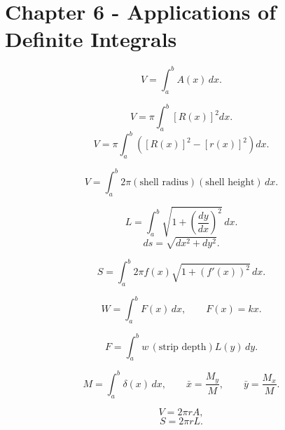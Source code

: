 
\section*{Chapter 6 - Applications of Definite Integrals}

\[
  V=\int_a^b A(x)\,dx.
\]

\[
  V=\pi\int_a^b\left[R(x)\right]^2dx.
\]
\[
  V=\pi\int_a^b\left(\left[R(x)\right]^2-\left[r(x)\right]^2\right)dx.
\]

\[
  V=\int_a^b 2\pi(\text{shell radius})(\text{shell height})\,dx.
\]

\[
  L=\int_a^b\sqrt{1+\left(\frac{dy}{dx}\right)^2}\,dx.
\]
\[
  ds=\sqrt{dx^2+dy^2}.
\]

\[
  S=\int_a^b 2\pi f(x)\sqrt{1+\left(f'(x)\right)^2}\,dx.
\]

\[
  W=\int_a^b F(x)\,dx,
  \qquad
  F(x)=kx.
\]

\[
  F=\int_a^b w\,(\text{strip depth})L(y)\,dy.
\]

\[
  M=\int_a^b\delta(x)\,dx,
  \qquad
  \bar{x}=\frac{M_y}{M},
  \qquad
  \bar{y}=\frac{M_x}{M}.
\]

\[
  V=2\pi rA,
\]
\[
  S=2\pi rL.
\]

